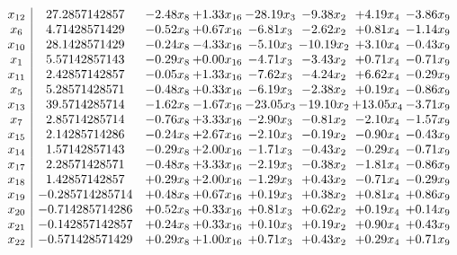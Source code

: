 \documentclass[8pt]{article}
\begin{document}
\[\begin{array}{c| c c@{\hskip 2pt} c@{\hskip 2pt} c@{\hskip 2pt} c@{\hskip 2pt} c@{\hskip 2pt} c@{\hskip 2pt} }
 x_{12}   &  27.2857142857 & -2.48 x_{8} & +  1.33 x_{16} & -28.19 x_{3} & -9.38 x_{2} & +  4.19 x_{4} & -3.86 x_{9}\\
 x_{6}   &  4.71428571429 & -0.52 x_{8} & +  0.67 x_{16} & -6.81 x_{3} & -2.62 x_{2} & +  0.81 x_{4} & -1.14 x_{9}\\
 x_{10}   &  28.1428571429 & -0.24 x_{8} & -4.33 x_{16} & -5.10 x_{3} & -10.19 x_{2} & +  3.10 x_{4} & -0.43 x_{9}\\
 x_{1}   &  5.57142857143 & -0.29 x_{8} & +  0.00 x_{16} & -4.71 x_{3} & -3.43 x_{2} & +  0.71 x_{4} & -0.71 x_{9}\\
 x_{11}   &  2.42857142857 & -0.05 x_{8} & +  1.33 x_{16} & -7.62 x_{3} & -4.24 x_{2} & +  6.62 x_{4} & -0.29 x_{9}\\
 x_{5}   &  5.28571428571 & -0.48 x_{8} & +  0.33 x_{16} & -6.19 x_{3} & -2.38 x_{2} & +  0.19 x_{4} & -0.86 x_{9}\\
 x_{13}   &  39.5714285714 & -1.62 x_{8} & -1.67 x_{16} & -23.05 x_{3} & -19.10 x_{2} & + 13.05 x_{4} & -3.71 x_{9}\\
 x_{7}   &  2.85714285714 & -0.76 x_{8} & +  3.33 x_{16} & -2.90 x_{3} & -0.81 x_{2} & -2.10 x_{4} & -1.57 x_{9}\\
 x_{15}   &  2.14285714286 & -0.24 x_{8} & +  2.67 x_{16} & -2.10 x_{3} & -0.19 x_{2} & -0.90 x_{4} & -0.43 x_{9}\\
 x_{14}   &  1.57142857143 & -0.29 x_{8} & +  2.00 x_{16} & -1.71 x_{3} & -0.43 x_{2} & -0.29 x_{4} & -0.71 x_{9}\\
 x_{17}   &  2.28571428571 & -0.48 x_{8} & +  3.33 x_{16} & -2.19 x_{3} & -0.38 x_{2} & -1.81 x_{4} & -0.86 x_{9}\\
 x_{18}   &  1.42857142857 & +  0.29 x_{8} & +  2.00 x_{16} & -1.29 x_{3} & +  0.43 x_{2} & -0.71 x_{4} & -0.29 x_{9}\\
 x_{19}   &  -0.285714285714 & +  0.48 x_{8} & +  0.67 x_{16} & +  0.19 x_{3} & +  0.38 x_{2} & +  0.81 x_{4} & +  0.86 x_{9}\\
 x_{20}   &  -0.714285714286 & +  0.52 x_{8} & +  0.33 x_{16} & +  0.81 x_{3} & +  0.62 x_{2} & +  0.19 x_{4} & +  0.14 x_{9}\\
 x_{21}   &  -0.142857142857 & +  0.24 x_{8} & +  0.33 x_{16} & +  0.10 x_{3} & +  0.19 x_{2} & +  0.90 x_{4} & +  0.43 x_{9}\\
 x_{22}   &  -0.571428571429 & +  0.29 x_{8} & +  1.00 x_{16} & +  0.71 x_{3} & +  0.43 x_{2} & +  0.29 x_{4} & +  0.71 x_{9}\\

\end{array}\]
\end{document}
